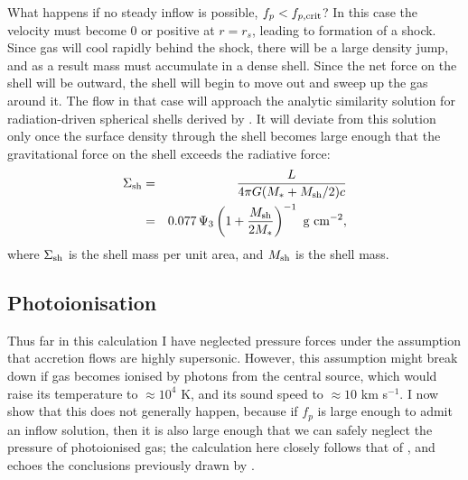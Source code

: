 \documentclass[useAMS,usenatbib]{mn2e}
\begin{document}
What happens if no steady inflow is possible, $f_p < f_{p,\rm crit}$? In this case the velocity must become 0 or positive at $r=r_s$, leading to formation of a shock. Since gas will cool rapidly behind the shock, there will be a large density jump, and as a result mass must accumulate in a dense shell. Since the net force on the shell will be outward, the shell will begin to move out and sweep up the gas around it. The flow in that case will approach the analytic similarity solution for radiation-driven spherical shells derived by \citet{krumholz09d}. It will deviate from this solution only once the surface density through the shell becomes large enough that the gravitational force on the shell exceeds the radiative force:
\begin{eqnarray}
\Sigma_{\rm sh} & = & \frac{L}{4 \pi G (M_* + M_{\rm sh}/2) c} 
\nonumber \\
& = &
0.077\, \Psi_3 \left(1+\frac{M_{\rm sh}}{2M_*}\right)^{-1}\mbox{ g cm}^{-2},
\end{eqnarray}
where $\Sigma_{\rm sh}$ is the shell mass per unit area, and $M_{\rm sh}$ is the shell mass.

\subsection{Photoionisation}

Thus far in this calculation I have neglected pressure forces under the assumption that accretion flows are highly supersonic. However, this assumption might break down if gas becomes ionised by photons from the central source, which would raise its temperature to $\approx 10^4$ K, and its sound speed to $\approx 10$ km s$^{-1}$. I now show that this does not generally happen, because if $f_p$ is large enough to admit an inflow solution, then it is also large enough that we can safely neglect the pressure of photoionised gas; the calculation here closely follows that of \citet{walmsley95a}, and echoes the conclusions previously drawn by \citet{keto02a, keto03a}.
\end{document}
